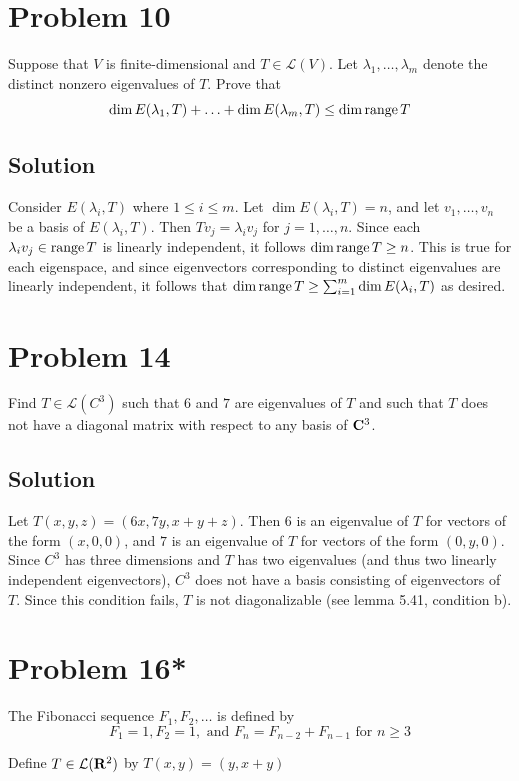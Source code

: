 \documentclass{article}
\begin{document}
\section*{Problem 10}
Suppose that $V$ is finite-dimensional and $T\in\mathcal{L}(V)$. Let $\lambda_1,\ldots,\lambda_m$ denote the distinct nonzero eigenvalues of $T$. Prove that
\[\dim E(\lambda_1,T)+\ldots+\dim E(\lambda_m, T)\leq \dim\text{range}\, T\]

\subsection*{Solution}
Consider $E(\lambda_i, T)$ where $1\leq i\leq m$. Let $\dim E(\lambda_i, T)=n$, and let $v_1,\ldots,v_n$ be a basis of $E(\lambda_i, T)$. Then $Tv_j=\lambda_i v_j$ for $j=1,\ldots,n$. Since each $\lambda_i v_j\in\text{range}\, T$ is linearly independent, it follows $\dim\text{range}\, T\geq n$. This is true for each eigenspace, and since eigenvectors corresponding to distinct eigenvalues are linearly independent, it follows that $\dim\text{range}\, T\geq\sum_{i=1}^m \dim E(\lambda_i, T)$ as desired.

\section*{Problem 14}
Find $T\in\mathcal{L}(C^3)$ such that $6$ and $7$ are eigenvalues of $T$ and such that $T$ does not have a diagonal matrix with respect to any basis of $\mathbf{C}^3$.

\subsection*{Solution}
Let $T(x,y,z)=(6x, 7y, x+y+z)$. Then $6$ is an eigenvalue of $T$ for vectors of the form $(x, 0, 0)$, and $7$ is an eigenvalue of $T$ for vectors of the form $(0, y, 0)$. Since $C^3$ has three dimensions and $T$ has two eigenvalues (and thus two linearly independent eigenvectors), $C^3$ does not have a basis consisting of eigenvectors of $T$. Since this condition fails, $T$ is not diagonalizable (see lemma 5.41, condition b).

\section*{Problem 16*}
The Fibonacci sequence $F_1,F_2,\ldots$ is defined by
\[F_1=1, F_2=1, \text{ and } F_n=F_{n-2}+F_{n-1}\text{ for }n\geq 3\]

Define $T\in\mathcal{L}(\mathbf{R}^2)$ by $T(x, y)=(y, x+y)$
\end{document}
